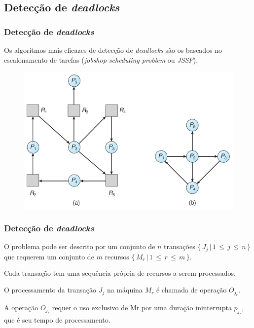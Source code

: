 \documentclass{beamer}
\begin{document}

\subsection{Detecção de \emph{deadlocks}}

\begin{frame} %
    \frametitle{Detecção de \emph{deadlocks}}

    Os algoritmos mais eficazes de detecção de \emph{deadlocks} são os baseados no escalonamento de tarefas (\emph{jobshop scheduling problem} ou \emph{JSSP}).

    \medskip
    \begin{figure}
        \includegraphics[width=0.75\linewidth]{deadlockdetection1.jpg}
    \end{figure}
\end{frame}


\begin{frame} %
    \frametitle{Detecção de \emph{deadlocks}}

    \begin{theorem}
        O problema pode ser descrito por um conjunto de \(n\) transações \(\{\, J_{j} \, | \, 1 \, \leq \, j \, \leq \, n\, \}\) que requerem um conjunto de \(m\) recursos \(\{\, M_{r} \, | \, 1 \, \leq \, r \, \leq \, m\, \}\).

        \medskip
        Cada transação tem uma sequência própria de recursos a serem processados.

        \medskip
        O processamento da transação \(J_j\) na máquina \(M_r\) é chamada de operação \(O_{j_{r}}\).

        \medskip
        A operação \(O_{j_{r}}\) requer o uso exclusivo de Mr por uma duração ininterrupta \(p_{j_{r}}\), que é seu tempo de processamento.
        
    \end{theorem}

\end{frame}
\end{document}
